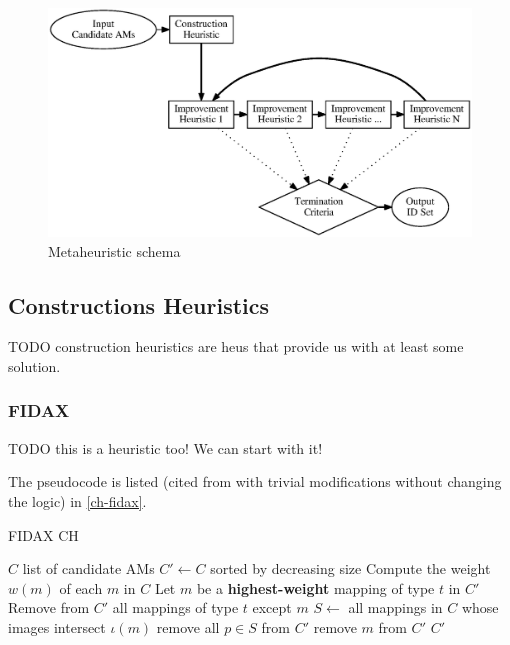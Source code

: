 \documentclass[a4paper,12pt,oneside]{report}
\begin{document}
\begin{figure}
  \caption{Metaheuristic schema}
  \label{image-metaheuristic}
  \centering
    \includegraphics[width=\textwidth]{images/metaheuristic.eps}
\end{figure}

\subsection{Constructions Heuristics}

TODO construction heuristics are heus that provide us with at least some solution.

\subsubsection{FIDAX}

TODO this is a heuristic too! We can start with it!

The pseudocode is listed (cited from \cite{fidax} with trivial modifications without changing the logic) in \ref{ch-fidax}.

\begin{algorithm}
\caption{FIDAX CH}
\label{ch-fidax}
\begin{algorithmic}
\REQUIRE $C$ list of candidate AMs
\STATE $C' \gets C$ sorted by decreasing size
\STATE Compute the weight $w(m)$ of each $m$ in $C$
  \STATE Let $m$ be a \textbf{highest-weight} mapping of type $t$ in $C'$
  \STATE Remove from $C'$ all mappings of type $t$ except $m$
\ENDFOR
{}
  \STATE $S \gets$ all mappings in $C$ whose images intersect $\iota(m)$
    \STATE remove all $p \in S$ from $C'$
  \ELSE
    \STATE remove $m$ from $C'$
  \ENDIF
\ENDFOR
\RETURN $C'$
\end{algorithmic}
\end{algorithm}
\end{document}
